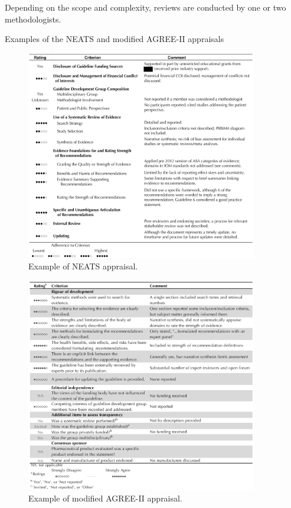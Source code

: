\documentclass[
  letterpaper,
  DIV=11,
  numbers=noendperiod]{scrreprt}
\begin{document}
Depending on the scope and complexity, reviews are conducted by one or
two methodologists.

Examples of the NEATS and modified AGREE-II appraisals

\begin{figure}

\caption{\label{fig-neats}Example of NEATS appraisal.}

\includegraphics[width=0.9\textwidth,height=\textheight]{assets/neatsExample.png} \hfill{}

\end{figure}

\begin{figure}

\caption{\label{fig-agree}Example of modified AGREE-II appraisal.}

\includegraphics[width=0.9\textwidth,height=\textheight]{assets/agreeExample.png} \hfill{}

\end{figure}
\end{document}
